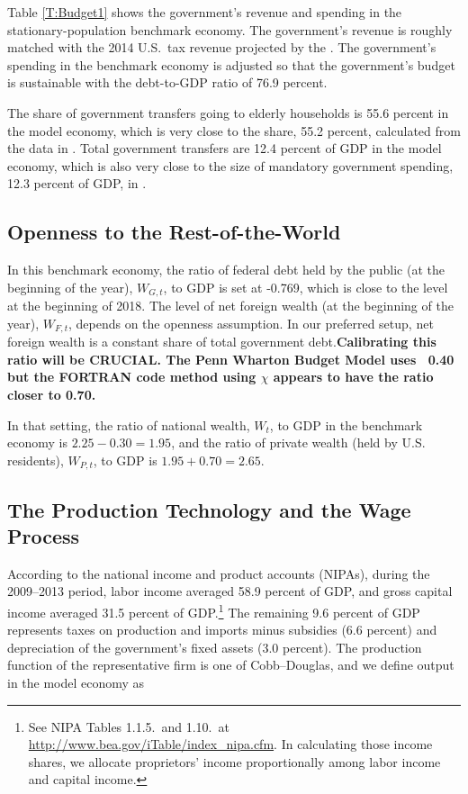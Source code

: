 \documentclass[11pt,leqno,fleqn]{article}
\begin{document}
Table \ref{T:Budget1} shows the government's revenue and spending in the stationary-population benchmark economy. The government's revenue is roughly matched with the 2014 U.S.\ tax revenue projected by the \citet{CBO:2014a}. The government's spending in the benchmark economy is adjusted so that the government's budget is sustainable with the debt-to-GDP ratio of 76.9 percent.

The share of government transfers going to elderly households is 55.6 percent in the model economy, which is very close to the share, 55.2 percent, calculated from the data in \citet{CBO:2013a}. Total government transfers are 12.4 percent of GDP in the model economy, which is also very close to the size of mandatory government spending, 12.3 percent of GDP, in \citet{CBO:2014a}.


\subsection{Openness to the Rest-of-the-World}

In this benchmark economy, the ratio of federal debt held by the public (at the beginning of the year), $W_{G,t}$, to GDP is set at -0.769, which is close to the level at the beginning of 2018. The level of net foreign wealth (at the beginning of the year), $W_{F,t}$, depends on the openness assumption. In our preferred setup, net foreign wealth is a constant share of total government debt.\textbf{Calibrating this ratio will be CRUCIAL. The Penn Wharton Budget Model uses ~0.40 but the FORTRAN code method using $\chi$ appears to have the ratio closer to 0.70.}

In that setting, the ratio of national wealth, $W_{t}$, to GDP in the benchmark economy is $2.25-0.30=1.95$, and the ratio of private wealth (held by U.S. residents), $W_{P,t}$, to GDP is $1.95+0.70=2.65$. 


\subsection{The Production Technology and the Wage Process}

According to the national income and product accounts (NIPAs), during the 2009--2013 period, labor income averaged 58.9 percent of GDP, and gross capital income averaged  31.5 percent of GDP.\footnote{See NIPA Tables 1.1.5.\ and 1.10.\ at \url{http://www.bea.gov/iTable/index_nipa.cfm}. In calculating those income shares, we allocate proprietors' income proportionally among labor income and capital income.} The remaining 9.6 percent of GDP represents taxes on production and imports minus subsidies (6.6 percent) and depreciation of the government's fixed assets (3.0 percent). The production function of the representative firm is one of Cobb--Douglas, and we define output in the model economy as
\end{document}
